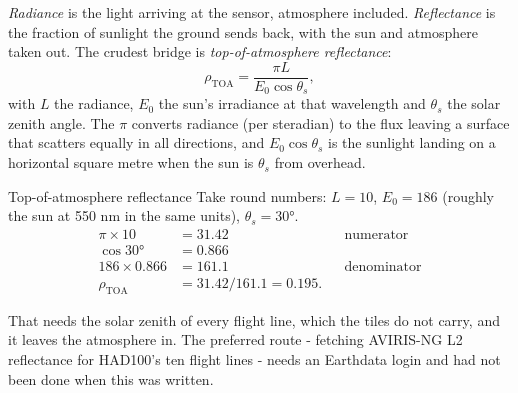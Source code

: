 \emph{Radiance} is the light arriving at the sensor, atmosphere included. \emph{Reflectance}
is the fraction of sunlight the ground sends back, with the sun and atmosphere taken out. The crudest bridge is
\emph{top-of-atmosphere reflectance}:
\begin{equation}\label{eq:benchmarks:toa}
\rho_{\text{TOA}} = \frac{\pi L}{E_0 \cos\theta_s},
\end{equation}
with $L$ the radiance, $E_0$ the sun's irradiance at that wavelength and $\theta_s$ the solar zenith angle. The
$\pi$ converts radiance (per steradian) to the flux leaving a surface that scatters equally in all directions, and
$E_0 \cos\theta_s$ is the sunlight landing on a horizontal square metre when the sun is $\theta_s$ from overhead.

\begin{worked}[label={we:benchmarks:toa}]{Top-of-atmosphere reflectance}
Take round numbers\tagA{}: $L = 10$, $E_0 = 186$ (roughly the sun at 550 nm in the same units), $\theta_s = 30°$.
\begin{align*}
\pi \times 10 &= 31.42 && \text{numerator}\\
\cos 30° &= 0.866\\
186 \times 0.866 &= 161.1 && \text{denominator}\\
\rho_{\text{TOA}} &= 31.42 / 161.1 = 0.195.
\end{align*}
\end{worked}

That needs the solar zenith of every flight line, which the tiles do not carry, and it leaves the atmosphere in. The
preferred route - fetching AVIRIS-NG L2 reflectance for HAD100's ten flight lines - needs an Earthdata login and had
not been done when this was written.

